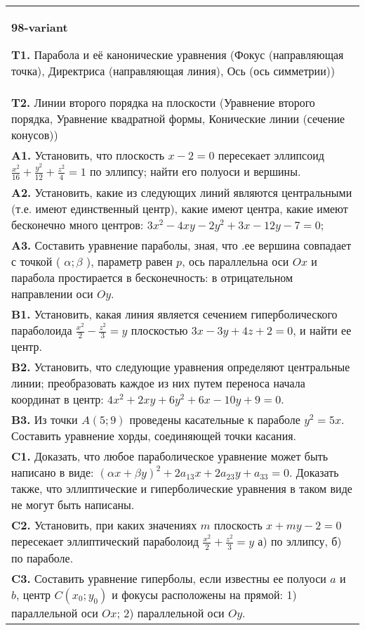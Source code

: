 \documentclass{article}
\begin{document}
\begin{tabular}{m{17cm}}
\textbf{98-variant}
\newline

\textbf{T1.} Парабола и её канонические уравнения (Фокус (направляющая точка), Директриса (направляющая линия), Ось (ось симметрии)) \\
\textbf{T2.} Линии второго порядка на плоскости (Уравнение второго порядка, Уравнение квадратной формы, Конические линии (сечение конусов)) \\
\textbf{A1.} Установить, что плоскость $x-2=0$ пересекает эллипсоид $\frac{x^2}{16}+\frac{y^2}{12}+\frac{z^2}{4}=1$ по эллипсу; найти его полуоси и вершины. \\
\textbf{A2.} Установить, какие из следующих линий являются центральными (т.е. имеют единственный центр), какие имеют центра, какие имеют бесконечно много центров: $3 x^2-4 x y-2 y^2+3 x-12 y-7=0$; \\
\textbf{A3.} Составить уравнение параболы, зная, что .ее вершина совпадает с точкой ( $\alpha ; \beta$ ), параметр равен $p$, ось параллельна оси $O x$ и парабола простирается в бесконечность: в отрицательном направлении оси $O y$. \\
\textbf{B1.} Установить, какая линия является сечением гиперболического параболоида $\frac{x^2}{2}-\frac{z^2}{3}=y$ плоскостью $3 x-3 y+4 z+2=0$, и найти ее центр. \\
\textbf{B2.} Установить, что следующие уравнения определяют центральные линии; преобразовать каждое из них путем переноса начала координат в центр: $4 x^2+2 x y+6 y^2+6 x-10 y+9=0$. \\
\textbf{B3.} Из точки $A(5 ; 9)$ проведены касательные к параболе $y^2=5 x$. Составить уравнение хорды, соединяющей точки касания. \\
\textbf{C1.} Доказать, что любое параболическое уравнение может быть написано в виде: $ (\alpha x+\beta y) ^2+2a_{13}x+2a_{23}y+a_{33}=0$. Доказать также, что эллиптические и гиперболические уравнения в таком виде не могут быть написаны. \\
\textbf{C2.} Установить, при каких значениях $m$ плоскость $x+m y-2=0$ пересекает эллиптический параболоид $\frac{x^2}{2}+\frac{z^2}{3}=y$ а) по эллипсу, б) по параболе. \\
\textbf{C3.} Составить уравнение гиперболы, если известны ее полуоси $a$ и $b$, центр $C\left(x_0 ; y_0\right)$ и фокусы расположены на прямой: 1) параллельной оси $O x$; 2) параллельной оси $O y$. \\

\end{tabular}
\vspace{1cm}
\end{document}
